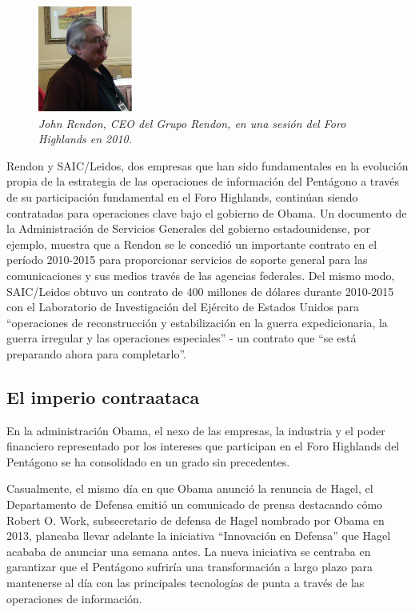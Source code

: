 \documentclass[10pt,a5paper,twoside,spanish,]{book}
\begin{document}
\begin{figure}[htbp]
\centering
\includegraphics{2.8.png}
\caption{\emph{John Rendon, CEO del Grupo Rendon, en una sesión del Foro
Highlands en 2010.}}
\end{figure}

Rendon y SAIC/Leidos, dos empresas que han sido fundamentales en la
evolución propia de la estrategia de las operaciones de información del
Pentágono a través de su participación fundamental en el Foro Highlands,
continúan siendo contratadas para operaciones clave bajo el gobierno de
Obama. Un documento de la Administración de Servicios Generales del
gobierno estadounidense, por ejemplo, muestra que a Rendon se le
concedió un importante contrato en el período 2010-2015 para
proporcionar servicios de soporte general para las comunicaciones y sus
medios través de las agencias federales. Del mismo modo, SAIC/Leidos
obtuvo un contrato de 400 millones de dólares durante 2010-2015 con el
Laboratorio de Investigación del Ejército de Estados Unidos para
``operaciones de reconstrucción y estabilización en la guerra
expedicionaria, la guerra irregular y las operaciones especiales'' - un
contrato que ``se está preparando ahora para completarlo''.

\subsection{El imperio contraataca}\label{el-imperio-contraataca}

En la administración Obama, el nexo de las empresas, la industria y el
poder financiero representado por los intereses que participan en el
Foro Highlands del Pentágono se ha consolidado en un grado sin
precedentes.

Casualmente, el mismo día en que Obama anunció la renuncia de Hagel, el
Departamento de Defensa emitió un comunicado de prensa destacando cómo
Robert O. Work, subsecretario de defensa de Hagel nombrado por Obama en
2013, planeaba llevar adelante la iniciativa ``Innovación en Defensa''
que Hagel acababa de anunciar una semana antes. La nueva iniciativa se
centraba en garantizar que el Pentágono sufriría una transformación a
largo plazo para mantenerse al día con las principales tecnologías de
punta a través de las operaciones de información.
\end{document}
